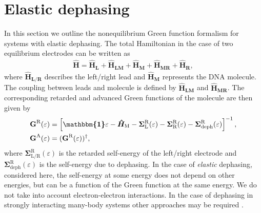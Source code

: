 \documentclass[reprint,superscriptaddress,nofootinbib,amsmath,amssymb,prb,floatfix]{revtex4-1}
\begin{document}
\section{Elastic dephasing}
\label{sec_deph}

In this section we outline the nonequilibrium Green function formalism for systems with elastic
dephasing. The total Hamiltonian in the case of two equilibrium electrodes can be written as
\begin{align}
    \boldsymbol{\hat{H}} =  \boldsymbol{\hat{H}_\text{L}} + \boldsymbol{\hat{H}_\text{LM}} + \boldsymbol{\hat{H}_\text{M}} + \boldsymbol{\hat{H}_\text{MR}} + \boldsymbol{\hat{H}_\text{R}},
\end{align}
where $\boldsymbol{\hat{H}_\text{L/R}}$ describes the left/right lead and
$\boldsymbol{\hat{H}_\text{M}}$ represents the DNA molecule. The coupling between leads and molecule
is defined by $\boldsymbol{\hat{H}_\text{LM}}$ and $\boldsymbol{\hat{H}_\text{MR}}$. The
corresponding retarded and advanced Green functions of the molecule are then given by
\begin{align} %
    \textbf{G}^\text{R} & (\varepsilon) = %
    \left[\boldsymbol{\mathbbm{1}}\varepsilon-\boldsymbol{\hat{H}_\text{M}}-
      \boldsymbol{\Sigma}^\text{R}_{\text{L}}(\varepsilon)-\boldsymbol{\Sigma}^\text{R}_{\text{R}}(\varepsilon)
      -\boldsymbol{\Sigma}^\text{R}_{\text{deph}}(\varepsilon)\right]^{-1}, \\
    \textbf{G}^\text{A} & (\varepsilon) = (\textbf{G}^\text{R}(\varepsilon))^\dagger,
\end{align}
%  
where $\boldsymbol{\Sigma}^\text{R}_{\text{L/R}}(\varepsilon)$ is the retarded self-energy of the
left/right electrode and $\boldsymbol{\Sigma}^\text{R}_{\text{deph}}(\varepsilon)$ is the
self-energy due to dephasing. In the case of {\it elastic} dephasing, considered here, the
self-energy at some energy does not depend on other energies, but can be a function of the Green
function at the same energy. We do not take into account electron-electron interactions. In the case of dephasing in strongly interacting many-body systems other approaches may be required \cite{Esposito10jpcc,White13prb}.
  
\end{document}
